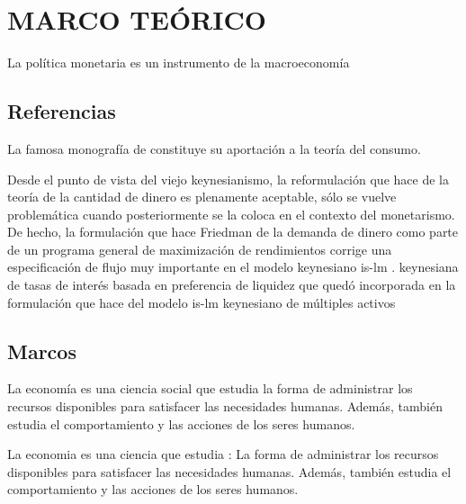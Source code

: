 \chapter{MARCO TEÓRICO}
La política monetaria es un instrumento de la macroeconomía
\section{Referencias}
La famosa monografía de  \cite{friedman2018theory}  constituye su aportación a la teoría del consumo. 

Desde el punto de vista del viejo keynesianismo, la reformulación que hace \cite{friedman2018theory} de la teoría de la cantidad de dinero es plenamente aceptable, sólo se vuelve problemática cuando posteriormente se la coloca en el contexto del monetarismo. De hecho, la formulación que hace Friedman de la demanda de dinero como parte de un programa general de maximización de rendimientos corrige una especificación de flujo muy importante en el modelo keynesiano is-lm \cite{hicks1937mr}. keynesiana de tasas de interés basada en preferencia de liquidez que quedó incorporada en la formulación que hace \cite{tobin1982money} del modelo is-lm keynesiano de múltiples activos

\section{Marcos}

\begin{tcolorbox}
La economía es una ciencia social que estudia la forma de administrar los recursos disponibles para satisfacer las necesidades humanas. Además, también estudia el comportamiento y las acciones de los seres humanos.
\end{tcolorbox}



\begin{tcolorbox}[title=\textbf{Ejemplos},
colback=blue!5!white,colframe=blue!75!white]
La economia es una ciencia que estudia :
\tcblower
La forma de administrar los recursos disponibles para satisfacer las necesidades humanas. Además, también estudia el comportamiento y las acciones de los seres humanos.
\end{tcolorbox}




